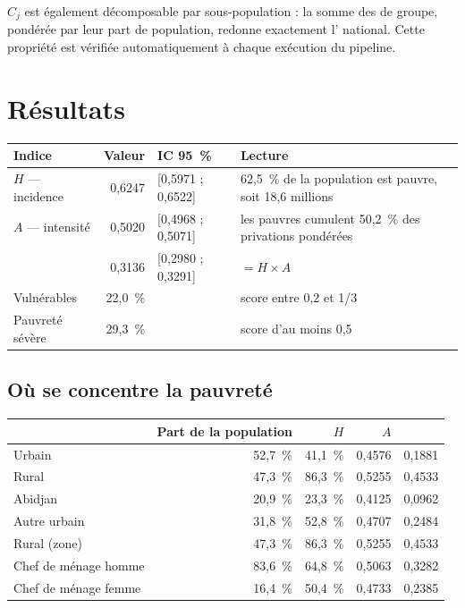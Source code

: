\documentclass[11pt,a4paper]{article}
\begin{document}
$C_j$ est également décomposable par sous-population : la somme des \ipm{} de groupe, pondérée
par leur part de population, redonne exactement l'\ipm{} national. Cette propriété est vérifiée
automatiquement à chaque exécution du pipeline.

\section{Résultats}

\begin{center}
\begin{tabular}{@{}lrll@{}}
\toprule
\textbf{Indice} & \textbf{Valeur} & \textbf{IC 95~\%} & \textbf{Lecture} \\
\midrule
$H$ --- incidence & 0,6247 & [0,5971 ; 0,6522] & 62,5~\% de la population est pauvre, soit
18,6 millions \\
$A$ --- intensité & 0,5020 & [0,4968 ; 0,5071] & les pauvres cumulent 50,2~\% des privations
pondérées \\
\ipm{} & 0,3136 & [0,2980 ; 0,3291] & $= H \times A$ \\
Vulnérables & 22,0~\% & & score entre 0,2 et 1/3 \\
Pauvreté sévère & 29,3~\% & & score d'au moins 0,5 \\
\bottomrule
\end{tabular}
\end{center}

\subsection{Où se concentre la pauvreté}

\begin{center}
\begin{tabular}{@{}lrrrr@{}}
\toprule
& \textbf{Part de la population} & \textbf{$H$} & \textbf{$A$} & \textbf{\ipm{}} \\
\midrule
Urbain & 52,7~\% & 41,1~\% & 0,4576 & 0,1881 \\
Rural  & 47,3~\% & 86,3~\% & 0,5255 & 0,4533 \\
\midrule
Abidjan & 20,9~\% & 23,3~\% & 0,4125 & 0,0962 \\
Autre urbain & 31,8~\% & 52,8~\% & 0,4707 & 0,2484 \\
Rural (zone) & 47,3~\% & 86,3~\% & 0,5255 & 0,4533 \\
\midrule
Chef de ménage homme & 83,6~\% & 64,8~\% & 0,5063 & 0,3282 \\
Chef de ménage femme & 16,4~\% & 50,4~\% & 0,4733 & 0,2385 \\
\bottomrule
\end{tabular}
\end{center}
\end{document}
